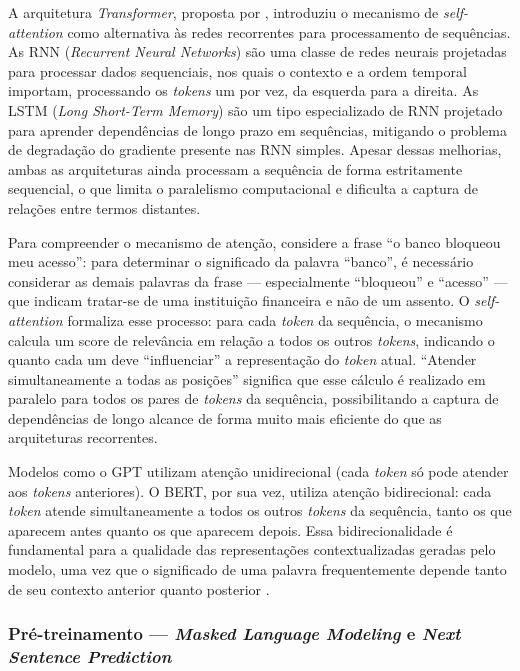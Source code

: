 \documentclass[
    12pt,                %
    openright,           %
    oneside,             %
    a4paper,             %
    english,             %
    brazil               %
]{abntex2}
\begin{document}
A arquitetura \textit{Transformer}, proposta por , 
introduziu o mecanismo de \textit{self-attention} como alternativa às redes 
recorrentes para processamento de sequências. As RNN (\textit{Recurrent Neural 
Networks}) são uma classe de redes neurais 
projetadas para processar dados sequenciais, nos quais o contexto e a ordem 
temporal importam, processando os \textit{tokens} um por vez, da esquerda para 
a direita. As LSTM (\textit{Long Short-Term Memory}) são um tipo especializado 
de RNN projetado para aprender dependências de longo prazo em sequências, 
mitigando o problema de degradação do gradiente presente nas RNN simples. 
Apesar dessas melhorias, ambas as arquiteturas ainda processam a sequência de 
forma estritamente sequencial, o que limita o paralelismo computacional e 
dificulta a captura de relações entre termos distantes.

Para compreender o mecanismo de atenção, considere a frase ``o banco bloqueou 
meu acesso'': para determinar o significado da palavra ``banco'', é necessário 
considerar as demais palavras da frase — especialmente ``bloqueou'' e ``acesso'' 
— que indicam tratar-se de uma instituição financeira e não de um assento. O 
\textit{self-attention} formaliza esse processo: para cada \textit{token} da 
sequência, o mecanismo calcula um score de relevância em relação a todos os 
outros \textit{tokens}, indicando o quanto cada um deve ``influenciar'' a 
representação do \textit{token} atual. ``Atender simultaneamente a todas as 
posições'' significa que esse cálculo é realizado em paralelo para todos os 
pares de \textit{tokens} da sequência, possibilitando a captura de dependências 
de longo alcance de forma muito mais eficiente do que as arquiteturas recorrentes.

Modelos como o GPT utilizam atenção unidirecional (cada \textit{token} só pode 
atender aos \textit{tokens} anteriores). O BERT, por sua vez, utiliza atenção 
bidirecional: cada \textit{token} atende simultaneamente a todos os outros 
\textit{tokens} da sequência, tanto os que aparecem antes quanto os que aparecem 
depois. Essa bidirecionalidade é fundamental para a qualidade das representações 
contextualizadas geradas pelo modelo, uma vez que o significado de uma palavra 
frequentemente depende tanto de seu contexto anterior quanto posterior 
\cite{devlin2019}.

\subsubsection{Pré-treinamento — \textit{Masked Language Modeling} e \textit{Next Sentence Prediction}}
\label{subsubsec:bert_pretrain}
\end{document}
